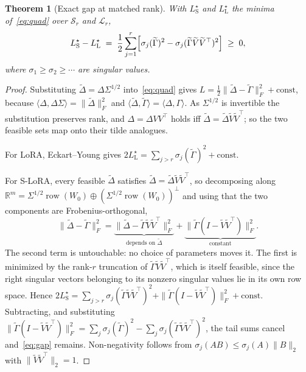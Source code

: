 \documentclass{article}
\newtheorem{theorem}{Theorem}
\theoremstyle{remark}
\begin{document}
\begin{theorem}[Exact gap at matched rank]\label{thm:gap}
With $L_{\mathrm{S}}^{\star}$ and $L_{\mathrm{L}}^{\star}$ the minima
of~\eqref{eq:quad} over $\mathcal{S}_r$ and $\mathcal{L}_r$,
\begin{equation}
  L_{\mathrm{S}}^{\star}-L_{\mathrm{L}}^{\star}
  \;=\;\frac12\sum_{j=1}^{r}\Bigl[\sigma_j(\widetilde\Gamma)^2-\sigma_j(\widetilde\Gamma\widetilde V\widetilde V^{\top})^2\Bigr]\;\ge\;0 ,
  \label{eq:gap}
\end{equation}
where $\sigma_1\ge\sigma_2\ge\cdots$ are singular values.
\end{theorem}

\begin{proof}
Substituting $\widetilde\Delta=\Delta\Sigma^{1/2}$ into~\eqref{eq:quad} gives
$L=\tfrac12\|\widetilde\Delta-\widetilde\Gamma\|_F^2+\mathrm{const}$, because
$\langle\Delta,\Delta\Sigma\rangle=\|\widetilde\Delta\|_F^2$ and
$\langle\widetilde\Delta,\widetilde\Gamma\rangle=\langle\Delta,\Gamma\rangle$.
As $\Sigma^{1/2}$ is invertible the substitution preserves rank, and
$\Delta=\Delta VV^{\top}$ holds iff
$\widetilde\Delta=\widetilde\Delta\widetilde V\widetilde V^{\top}$; so the two
feasible sets map onto their tilde analogues.

For LoRA, Eckart--Young gives
$2L_{\mathrm{L}}^{\star}=\sum_{j>r}\sigma_j(\widetilde\Gamma)^2+\mathrm{const}$.

For S-LoRA, every feasible $\widetilde\Delta$ satisfies
$\widetilde\Delta=\widetilde\Delta\widetilde V\widetilde V^{\top}$, so
decomposing along
$\mathbb{R}^{m}=\Sigma^{1/2}\operatorname{row}(W_0)\oplus(\Sigma^{1/2}\operatorname{row}(W_0))^{\perp}$
and using that the two components are Frobenius-orthogonal,
\begin{equation}
  \|\widetilde\Delta-\widetilde\Gamma\|_F^2
  =\underbrace{\bigl\|\widetilde\Delta-\widetilde\Gamma\widetilde V\widetilde V^{\top}\bigr\|_F^2}_{\text{depends on }\widetilde\Delta}
  +\underbrace{\bigl\|\widetilde\Gamma(I-\widetilde V\widetilde V^{\top})\bigr\|_F^2}_{\text{constant}} .
  \label{eq:pythagoras}
\end{equation}
The second term is untouchable: no choice of parameters moves it. The first is
minimized by the rank-$r$ truncation of $\widetilde\Gamma\widetilde
V\widetilde V^{\top}$, which is itself feasible, since the right singular
vectors belonging to its nonzero singular values lie in its own row space.
Hence
$2L_{\mathrm{S}}^{\star}=\sum_{j>r}\sigma_j(\widetilde\Gamma\widetilde V\widetilde V^{\top})^2+\|\widetilde\Gamma(I-\widetilde V\widetilde V^{\top})\|_F^2+\mathrm{const}$.
Subtracting, and substituting
$\|\widetilde\Gamma(I-\widetilde V\widetilde V^{\top})\|_F^2=\sum_{j}\sigma_j(\widetilde\Gamma)^2-\sum_{j}\sigma_j(\widetilde\Gamma\widetilde V\widetilde V^{\top})^2$,
the tail sums cancel and~\eqref{eq:gap} remains. Non-negativity follows from
$\sigma_j(AB)\le\sigma_j(A)\|B\|_2$ with $\|\widetilde V\widetilde V^{\top}\|_2=1$.
\end{proof}
\end{document}
